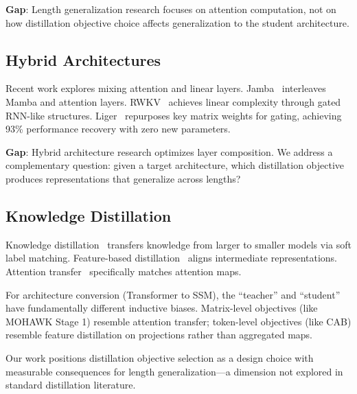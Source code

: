 \textbf{Gap}: Length generalization research focuses on attention computation, not on how distillation objective choice affects generalization to the student architecture.

\subsection{Hybrid Architectures}

Recent work explores mixing attention and linear layers. Jamba~\cite{lieber2024jamba} interleaves Mamba and attention layers. RWKV~\cite{peng2023rwkv} achieves linear complexity through gated RNN-like structures. Liger~\cite{lan2025liger} repurposes key matrix weights for gating, achieving 93\% performance recovery with zero new parameters.

\textbf{Gap}: Hybrid architecture research optimizes layer composition. We address a complementary question: given a target architecture, which distillation objective produces representations that generalize across lengths?

\subsection{Knowledge Distillation}

Knowledge distillation~\cite{hinton2015distilling} transfers knowledge from larger to smaller models via soft label matching. Feature-based distillation~\cite{romero2015fitnets} aligns intermediate representations. Attention transfer~\cite{zagoruyko2017attention} specifically matches attention maps.

For architecture conversion (Transformer to SSM), the ``teacher'' and ``student'' have fundamentally different inductive biases. Matrix-level objectives (like MOHAWK Stage 1) resemble attention transfer; token-level objectives (like CAB) resemble feature distillation on projections rather than aggregated maps.

Our work positions distillation objective selection as a design choice with measurable consequences for length generalization---a dimension not explored in standard distillation literature.
